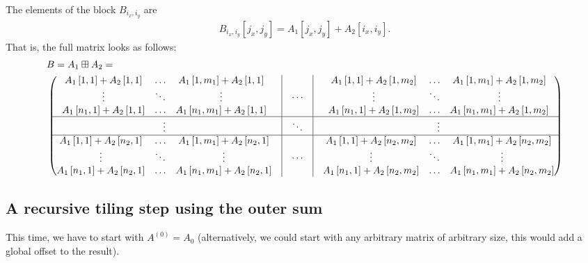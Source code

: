\documentclass[a4paper,11pt]{article}
\theoremstyle{mystyle}
\newcommand{\ie}{i.\,e.\ }
\begin{document}
The elements of the block $B_{i_x,i_y}$ are
\begin{align*}
B_{i_x,i_y}\left[j_x, j_y\right] = A_1\left[j_x, j_y \right] + A_2\left[ i_x, i_y\right].
\end{align*}
That is, the full matrix looks as follows:
{\tiny
\begin{align*}
& B = A_1 \boxplus A_2 =\\
& \begin{pmatrix}
\begin{matrix}
A_1\left[1,1\right] + A_2\left[1,1\right] & \dots & A_1\left[1,m_1\right] + A_2\left[1,1\right] \\
\vdots & \ddots & \vdots \\
A_1\left[n_1,1\right] + A_2\left[1,1\right] & \dots & A_1\left[n_1,m_1\right] + A_2\left[1,1\right]
\end{matrix} & \vline & \dots & \vline &
\begin{matrix}
A_1\left[1,1\right] + A_2\left[1,m_2\right] & \dots & A_1\left[1,m_1\right] + A_2\left[1,m_2\right] \\
\vdots & \ddots & \vdots \\
A_1\left[n_1,1\right] + A_2\left[1,m_2\right] & \dots & A_1\left[n_1,m_1\right] + A_2\left[1,m_2\right]
\end{matrix}\\ \hline
\vdots & \vline & \ddots & \vline & \vdots \\ \hline
\begin{matrix}
A_1\left[1,1\right] + A_2\left[n_2,1\right] & \dots & A_1\left[1,m_1\right] + A_2\left[n_2,1\right] \\
\vdots & \ddots & \vdots \\
A_1\left[n_1,1\right] + A_2\left[n_2,1\right] & \dots & A_1\left[n_1,m_1\right] + A_2\left[n_2,1\right]
\end{matrix} & \vline & \dots & \vline &
\begin{matrix}
A_1\left[1,1\right] + A_2\left[n_2,m_2\right] & \dots & A_1\left[1,m_1\right] + A_2\left[n_2,m_2\right] \\
\vdots & \ddots & \vdots \\
A_1\left[n_1,1\right] + A_2\left[n_2,m_2\right] & \dots & A_1\left[n_1,m_1\right] + A_2\left[n_2,m_2\right]
\end{matrix}
\end{pmatrix}
\end{align*}
}


\subsection{A recursive tiling step using the outer sum}
This time, we have to start with  $A^{(0)}=A_0$ %
(alternatively, we could start with any arbitrary matrix of arbitrary size, this would add a global offset to the result).
\end{document}
